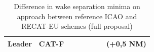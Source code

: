 \begin{table}[]
{\begin{tabular}{|c|c|c|c|c|c|c|c|}
\multirow{-6}{*}{Leader}                                & CAT-F &                                   &                                      &                               &                               &                               & \cellcolor[HTML]{FD6864}(+0,5 NM)                    \\ \hline 
\end{tabular}%
}
\caption[Difference in wake separation minima on approach between reference ICAO and RECAT-EU schemes]{Difference in wake separation minima on approach between reference ICAO and RECAT-EU schemes (full proposal) \cite{rooseleer2015recat}}
\label{tab:delta_distance_wtc2recat}
\end{table}



